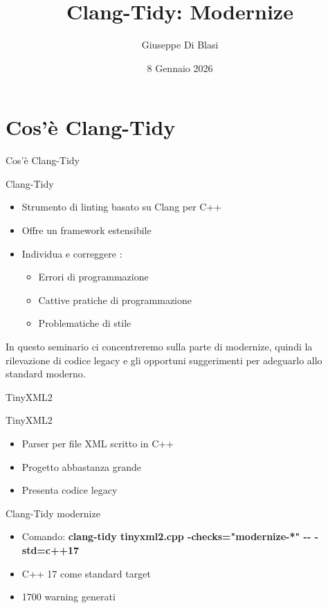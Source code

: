 \documentclass[aspectratio=169]{beamer}
\title{Clang-Tidy: Modernize}
\author{Giuseppe Di Blasi}
\institute{Università di Parma}
\date{8 Gennaio 2026}
\begin{document}
\begin{frame}
\titlepage
\end{frame}

\section{Cos'è Clang-Tidy}

\begin{frame}{Cos'è Clang-Tidy}

 
  \begin{block}{Clang-Tidy}
    
  \begin{itemize}
    \item Strumento di linting basato su Clang per C++
    \item Offre un framework estensibile
    \item Individua e correggere : 
      \begin{itemize}
        \item Errori di programmazione
        \item Cattive pratiche di programmazione
        \item Problematiche di stile
      \end{itemize}
  \end{itemize}
\end{block}

  In questo seminario ci concentreremo sulla parte di modernize, quindi la rilevazione di codice legacy e 
  gli opportuni suggerimenti per adeguarlo allo standard moderno.

\end{frame}

\begin{frame}{TinyXML2}
 
  \begin{block}{TinyXML2}
    \begin{itemize}
      \item Parser per file XML scritto in C++
      \item Progetto abbastanza grande
      \item Presenta codice legacy 
    \end{itemize}
  \end{block}
   
  \begin{block}{Clang-Tidy modernize}
    \begin{itemize}
      \item Comando: \textbf{clang-tidy tinyxml2.cpp -checks="modernize-*" -{-} -std=c++17 }
    \item C++ 17 come standard target
    \item 1700 warning generati
  \end{itemize}
  \end{block}

\end{frame}
\end{document}
